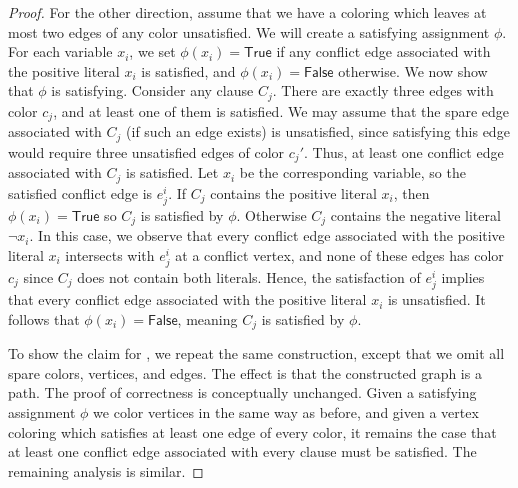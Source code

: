\begin{proof}
    For the other direction, assume that we have a coloring which leaves at most two edges of any color unsatisfied. We will create a satisfying assignment $\phi$.
    For each variable $x_i$, we set $\phi(x_i) = \textsf{True}$ if any conflict edge associated with the positive literal $x_i$ is satisfied, and $\phi(x_i) = \textsf{False}$ otherwise.
    We now show that $\phi$ is satisfying. Consider any clause $C_j$. There are exactly three edges with color $c_j$, and at least one of them is satisfied.
    We may assume that the spare edge associated with $C_j$ (if such an edge exists) is unsatisfied, since satisfying this edge would require three unsatisfied edges of color $c_j'$. Thus,
    at least one conflict edge associated with $C_j$ is satisfied. Let $x_i$ be the corresponding variable, so the satisfied conflict edge is $e_j^i$.
    If $C_j$ contains the positive literal $x_i$, then $\phi(x_i) = \textsf{True}$ so $C_j$ is satisfied by $\phi$.
    Otherwise $C_j$ contains the negative literal $\neg x_i$.
    In this case, we observe that every conflict edge associated with the positive literal $x_i$ intersects with $e_j^i$ at a conflict vertex, and none of these edges has color $c_j$ since
    $C_j$ does not contain both literals. Hence, the satisfaction of $e_j^i$ implies that every conflict edge associated with the positive literal $x_i$ is unsatisfied.
    It follows that $\phi(x_i) = \textsf{False}$, meaning $C_j$ is satisfied by $\phi$.

    To show the claim for \cfmaxECC{}, we repeat the same construction, except that we omit all spare colors, vertices, and edges. The effect is that the constructed graph is a path.
    The proof of correctness is conceptually unchanged. Given a satisfying assignment $\phi$ we color vertices in the same way as before, and given a vertex coloring which satisfies
    at least one edge of every color, it remains the case that at least one conflict edge associated with every clause must be satisfied.
    The remaining analysis is similar.
\end{proof}

